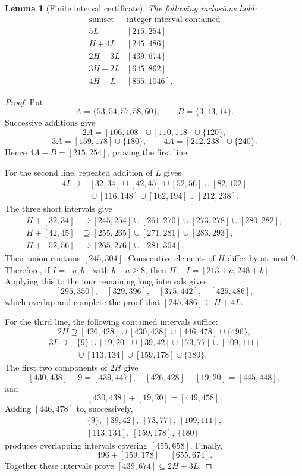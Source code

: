 \documentclass[12pt]{article}
\theoremstyle{plain}
\newtheorem{lemma}[theorem]{Lemma}
\begin{document}
\begin{lemma}[Finite interval certificate]\label{lem:finitefive}
The following inclusions hold:
\[
\begin{array}{c|c}
\text{sumset}&\text{integer interval contained}\\ \hline
5L &[215,254]\\
H+4L &[245,486]\\
2H+3L &[439,674]\\
3H+2L &[645,862]\\
4H+L &[855,1046].
\end{array}
\]
\end{lemma}

\begin{proof}
Put
\[
 A=\{53,54,57,58,60\},\qquad B=\{3,13,14\}.
\]
Successive additions give
\[
 2A=[106,108]\cup[110,118]\cup\{120\},
\]
\[
 3A=[159,178]\cup\{180\},\qquad
 4A=[212,238]\cup\{240\}.
\]
Hence $4A+B=[215,254]$, proving the first line.

For the second line, repeated addition of $L$ gives
\[
\begin{split}
4L\supseteq{}&[32,34]\cup[42,45]\cup[52,56]\cup[82,102]\\
 &{}\cup[116,148]\cup[162,194]\cup[212,238].
\end{split}
\]
The three short intervals give
\[
\begin{aligned}
H+[32,34]&\supseteq[245,254]\cup[261,270]
 \cup[273,278]\cup[280,282],\\
H+[42,45]&\supseteq[255,265]\cup[271,281]\cup[283,293],\\
H+[52,56]&\supseteq[265,276]\cup[281,304].
\end{aligned}
\]
Their union contains $[245,304]$.  Consecutive elements of $H$ differ
by at most $9$.  Therefore, if $I=[a,b]$ with $b-a\geq8$, then
$H+I=[213+a,248+b]$.  Applying this to the four remaining long
intervals gives
\[
 [295,350],\quad[329,396],\quad[375,442],\quad[425,486],
\]
which overlap and complete the proof that $[245,486]\subseteq H+4L$.

For the third line, the following contained intervals suffice:
\[
 2H\supseteq[426,428]\cup[430,438]\cup[446,478]\cup\{496\},
\]
\[
\begin{split}
3L\supseteq{}&\{9\}\cup[19,20]\cup[39,42]\cup[73,77]
 \cup[109,111]\\
 &{}\cup[113,134]\cup[159,178]\cup\{180\}.
\end{split}
\]
The first two components of $2H$ give
\[
 [430,438]+9=[439,447],\quad
 [426,428]+[19,20]=[445,448],
\]
and
\[
 [430,438]+[19,20]=[449,458].
\]
Adding $[446,478]$ to, successively,
\[
\begin{gathered}
 \{9\},\ [39,42],\ [73,77],\ [109,111],\\
 [113,134],\ [159,178],\ \{180\}
\end{gathered}
\]
produces overlapping intervals covering $[455,658]$.  Finally,
\[
 496+[159,178]=[655,674].
\]
Together these intervals prove $[439,674]\subseteq2H+3L$.


\end{proof}
\end{document}
